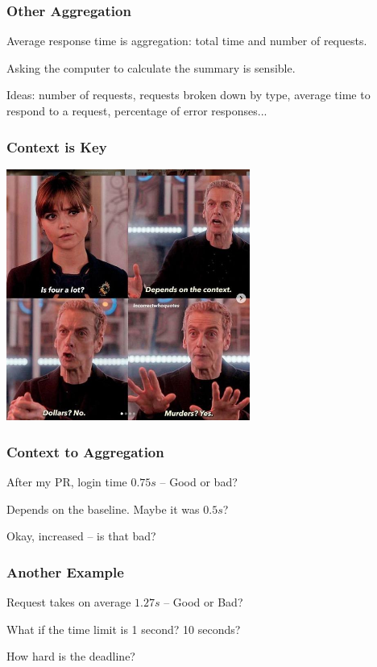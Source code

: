 \begin{frame}
\frametitle{Other Aggregation}

Average response time is aggregation: total time and number of requests.

Asking the computer to calculate the summary is sensible.

Ideas: number of requests, requests broken down by type, average time to respond to a request, percentage of error responses...  


\end{frame}


\begin{frame}
\frametitle{Context is Key}

\begin{center}
	\includegraphics[width=0.6\textwidth]{images/context.jpg}
\end{center}


\end{frame}


\begin{frame}
\frametitle{Context to Aggregation}

After my PR, login time $0.75s$ -- Good or bad?

Depends on the baseline. Maybe it was $0.5s$?


Okay, increased -- is that bad?

\end{frame}


\begin{frame}
\frametitle{Another Example}

Request takes on average $1.27s$ -- Good or Bad?

What if the time limit is 1 second? 10 seconds?

How hard is the deadline?

\end{frame}


